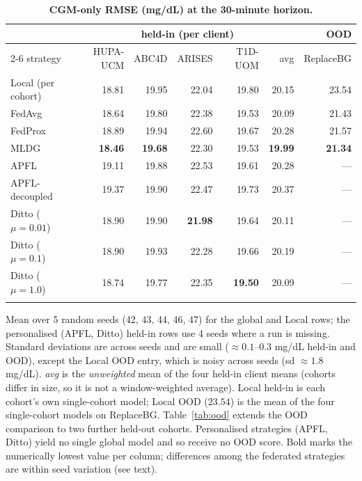 \documentclass[10pt,letterpaper]{article}
\newlength\savedwidth
\newcommand\thickhline{\noalign{\global\savedwidth\arrayrulewidth\global\arrayrulewidth 2pt}%
\hline
\noalign{\global\arrayrulewidth\savedwidth}}
\begin{document}
\begin{table}[!ht]
\centering
\captionsetup{justification=centering,singlelinecheck=on}
\caption{\bf CGM-only RMSE (mg/dL) at the 30-minute horizon.}
\label{tab:main}
\begin{tabular}{lrrrrrr}
\thickhline
 & \multicolumn{5}{c}{held-in (per client)} & OOD \\
\cline{2-6}
strategy & HUPA-UCM & ABC4D & ARISES & T1D-UOM & avg & ReplaceBG \\
\hline
Local (per cohort) & 18.81 & 19.95 & 22.04 & 19.80 & 20.15 & 23.54 \\
\hline
FedAvg  & 18.64 & 19.80 & 22.38 & 19.53 & 20.09 & 21.43 \\
FedProx & 18.89 & 19.94 & 22.60 & 19.67 & 20.28 & 21.57 \\
MLDG    & \textbf{18.46} & \textbf{19.68} & 22.30 & 19.53 & \textbf{19.99} & \textbf{21.34} \\
\hline
APFL          & 19.11 & 19.88 & 22.53 & 19.61 & 20.28 & --- \\
APFL-decoupled & 19.37 & 19.90 & 22.47 & 19.73 & 20.37 & --- \\
Ditto ($\mu{=}0.01$) & 18.90 & 19.90 & \textbf{21.98} & 19.64 & 20.11 & --- \\
Ditto ($\mu{=}0.1$)  & 18.90 & 19.93 & 22.28 & 19.66 & 20.19 & --- \\
Ditto ($\mu{=}1.0$)  & 18.74 & 19.77 & 22.35 & \textbf{19.50} & 20.09 & --- \\
\thickhline
\end{tabular}
\begin{center}
{\small Mean over 5 random seeds (42, 43, 44, 46, 47) for the global and Local
rows; the personalised (APFL, Ditto) held-in rows use 4 seeds where a run is
missing. Standard deviations are across seeds and are small ($\approx 0.1$--$0.3$
mg/dL held-in and OOD), except the Local OOD entry, which is noisy across seeds
(sd $\approx 1.8$ mg/dL). \emph{avg} is the \emph{unweighted} mean of the four
held-in client means (cohorts differ in size, so it is not a window-weighted
average). Local held-in is each cohort's own single-cohort model; Local OOD
($23.54$) is the mean of the four single-cohort models on ReplaceBG.
Table~\ref{tab:ood} extends the OOD comparison to two further held-out cohorts.
Personalised strategies (APFL, Ditto) yield no single global model and so receive
no OOD score. Bold marks the numerically lowest value per column; differences
among the federated strategies are within seed variation (see text).}
\end{center}
\end{table}
\end{document}
